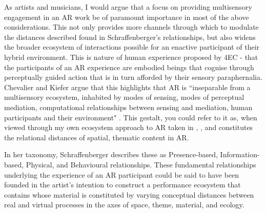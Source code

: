 As artists and musicians, I would argue that a focus on providing multisensory engagement in an AR work be of paramount importance in most of the above considerations. This not only provides more channels through which to modulate the distances described found in Schraffenberger's relationships, but also widens the broader ecosystem of interactions possible for an enactive participant of their hybrid environment. This is nature of human experience proposed by 4EC - that the participants of an AR experience are embodied beings that cognise through perceptually guided action that is in turn afforded by their sensory paraphernalia. 
Chevalier and Kiefer argue that this highlights that AR is ``inseparable from a multisensory ecosystem, inhabited by modes of sensing, modes of perceptual mediation, computational relationships between sensing and mediation, human participants and their environment" \citeyearpar[p. 4]{chevalier2020}. This gestalt, you could refer to it as, when viewed through my own ecosystem approach to AR taken in \textit{}, \textit{}, and \textit{} constitutes the relational distances of spatial, thematic content in AR. 

In her taxonomy, Schraffenberger describes these as Presence-based, Information-based, Physical, and Behavioural relationships. These fundamental relationships underlying the experience of an AR participant could be said to have been founded in the artist's intention to construct a performance ecosystem that contains whose material is constituted by varying conceptual distances between real and virtual processes in the axes of space, theme, material, and ecology. 

